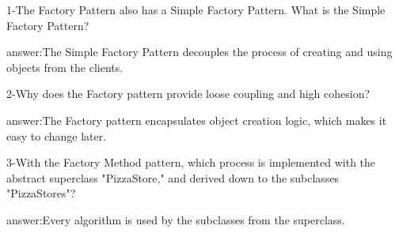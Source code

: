 1-The Factory Pattern also has a Simple Factory Pattern. What is the Simple Factory Pattern?

answer:The Simple Factory Pattern decouples the process of creating and using objects from the clients.

2-Why does the Factory pattern provide loose coupling and high cohesion?

answer:The Factory pattern encapsulates object creation logic, which makes it easy to change later.

3-With the Factory Method pattern, which process is implemented with the abstract superclass "PizzaStore," and derived down to the subclasses "PizzaStores"?

answer:Every algorithm is used by the subclasses from the superclass.

